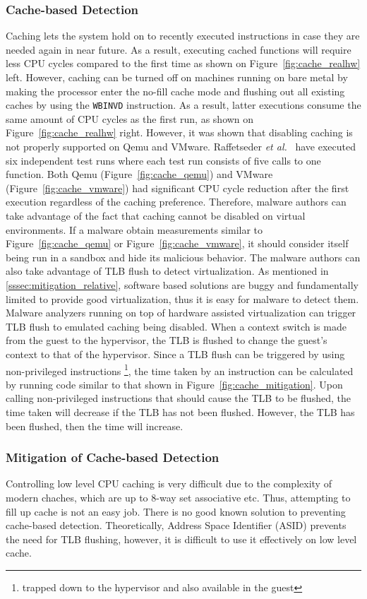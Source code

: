 \subsubsection{Cache-based Detection}
Caching lets the system hold on to recently executed instructions in case they
are needed again in near future. As a result, executing cached functions will
require less CPU cycles compared to the first time as shown on
Figure~\ref{fig:cache_realhw} left. However, caching can be turned off on
machines running on bare metal by making the processor enter the no-fill cache
mode and flushing out all existing caches by using the {\tt WBINVD} instruction.
As a result, latter executions consume the same amount of CPU cycles as the
first run, as shown on Figure~\ref{fig:cache_realhw} right. However, it was
shown that disabling caching is not properly supported on Qemu and VMware.
Raffetseder {\em et al.}~\cite{raffetseder2007} have executed six independent
test runs where each test run consists of five calls to one function. Both Qemu
(Figure~\ref{fig:cache_qemu}) and VMware (Figure~\ref{fig:cache_vmware}) had
significant CPU cycle reduction after the first execution regardless of the
caching preference. Therefore, malware authors can take advantage of the fact
that caching cannot be disabled on virtual environments. If a malware obtain
measurements similar to Figure~\ref{fig:cache_qemu} or
Figure~\ref{fig:cache_vmware}, it should consider itself being run in a sandbox
and hide its malicious behavior. The malware authors can also take advantage of
TLB flush to detect virtualization. As mentioned in
\ref{sssec:mitigation_relative}, software based solutions are buggy and
fundamentally limited to provide good virtualization, thus it is easy for
malware to detect them. Malware analyzers running on top of hardware assisted
virtualization can trigger TLB flush to emulated caching being disabled. When a
context switch is made from the guest to the hypervisor, the TLB is flushed to
change the guest's context to that of the hypervisor. Since a TLB flush can be
triggered by using non-privileged instructions \footnote{trapped down to the
  hypervisor and also available in the guest}, the time taken by an instruction
can be calculated by running code similar to that shown in
Figure~\ref{fig:cache_mitigation}. Upon calling non-privileged instructions that
should cause the TLB to be flushed, the time taken will decrease if the TLB has
not been flushed. However, the TLB has been flushed, then the time will
increase.

\subsubsection{Mitigation of Cache-based Detection}
Controlling low level CPU caching is very difficult due to the complexity of
modern chaches, which are up to 8-way set associative etc. Thus, attempting to
fill up cache is not an easy job. There is no good known solution to preventing
cache-based detection. Theoretically, Address Space Identifier (ASID) prevents
the need for TLB flushing, however, it is difficult to use it effectively on low
level cache.

